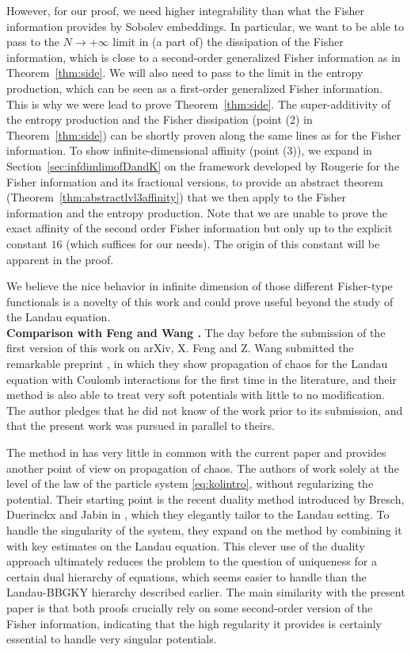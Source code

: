 \documentclass[11pt,a4paper]{article}
\theoremstyle{definition}
\theoremstyle{plain}
\begin{document}
However, for our proof, we need higher integrability than what the Fisher information provides by Sobolev embeddings. In particular, we want to be able to pass to the $N\rightarrow +\infty$ limit in (a part of) the dissipation of the Fisher information, which is close to a second-order generalized Fisher information as in Theorem~\ref{thm:side}. We will also need to pass to the limit in the entropy production, which can be seen as a first-order generalized Fisher information. This is why we were lead to prove Theorem~\ref{thm:side}. The super-additivity of the entropy production and the Fisher dissipation (point (2) in Theorem~\ref{thm:side}) can be shortly proven along the same lines as for the Fisher information. To show infinite-dimensional affinity (point (3)), we expand in Section~\ref{sec:infdimlimofDandK} on the framework developed by Rougerie \cite{Rougerie2020} for the Fisher information and its fractional versions, to provide an abstract theorem (Theorem~\ref{thm:abstractlvl3affinity}) that we then apply to the Fisher information and the entropy production. Note that we are unable to prove the exact affinity of the second order Fisher information but only up to the explicit constant $16$ (which suffices for our needs). The origin of this constant will be apparent in the proof.

We believe the nice behavior in infinite dimension of those different Fisher-type functionals is a novelty of this work and could prove useful beyond the study of the Landau equation.
\\

\textbf{Comparison with Feng and Wang \cite{FengWang2025}.} The day before the submission of the first version of this work on arXiv, X. Feng and Z. Wang submitted the remarkable preprint \cite{FengWang2025}, in which they show propagation of chaos for the Landau equation with Coulomb interactions for the first time in the literature, and their method is also able to treat very soft potentials with little to no modification. The author pledges that he did not know of the work \cite{FengWang2025} prior to its submission, and that the present work was pursued in parallel to theirs.

The method in \cite{FengWang2025} has very little in common with the current paper and provides another point of view on propagation of chaos. The authors of \cite{FengWang2025} work solely at the level of the law of the particle system \eqref{eq:kolintro}, without regularizing the potential. Their starting point is the recent duality method introduced by Bresch, Duerinckx and Jabin in \cite{BreschDuerinckxJabin2025}, which they elegantly tailor to the Landau setting. To handle the singularity of the system, they expand on the method by combining it with key estimates on the Landau equation. This clever use of the duality approach ultimately reduces the problem to the question of uniqueness for a certain dual hierarchy of equations, which seems easier to handle than the Landau-BBGKY hierarchy described earlier. The main similarity with the present paper is that both proofs crucially rely on some second-order version of the Fisher information, indicating that the high regularity it provides is certainly essential to handle very singular potentials.
\end{document}
